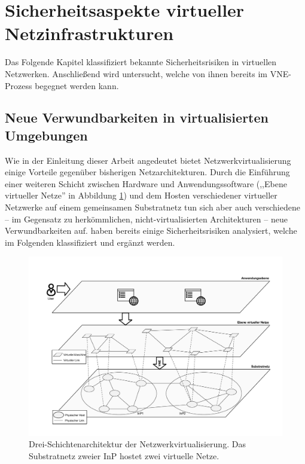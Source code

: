 \documentclass{lni}
\begin{document}
\section{Sicherheitsaspekte virtueller Netzinfrastrukturen}
\label{sec:gefahren}
Das Folgende Kapitel klassifiziert bekannte Sicherheitsrisiken in virtuellen Netzwerken. Anschließend wird untersucht, welche von ihnen bereits im VNE-Prozess begegnet werden kann.


%


\subsection{Neue Verwundbarkeiten in virtualisierten Umgebungen}
\label{subsec:gefahren_virt}
Wie in der Einleitung dieser Arbeit angedeutet bietet Netzwerkvirtualisierung einige Vorteile gegenüber bisherigen Netzarchitekturen. Durch die Einführung einer weiteren Schicht zwischen Hardware und Anwendungssoftware (,,Ebene virtueller Netze'' in Abbildung \ref{fig:gefahren_dreiEbenenDerVirtualisierung}) und dem Hosten verschiedener virtueller Netzwerke auf einem gemeinsamen Substratnetz tun sich aber auch verschiedene -- im Gegensatz zu herkömmlichen, nicht-virtualisierten Architekturen -- neue Verwundbarkeiten auf. \cite{gong2016virtual, natarajansecurity, wu2010network, garfinkel2005virtual, dahbur2011survey} haben bereits einige Sicherheitsrisiken analysiert, welche im Folgenden klassifiziert und ergänzt werden.

\begin{figure}[htb]
	\begin{center}
		\includegraphics[width=\textwidth]{gefahren_dreiEbenenDerVirtualisierung.pdf}
		\caption{\label{fig:gefahren_dreiEbenenDerVirtualisierung} Drei-Schichtenarchitektur der Netzwerkvirtualisierung. \newline
		Das Substratnetz zweier InP hostet zwei virtuelle Netze.}
	\end{center}
\end{figure}
\end{document}
